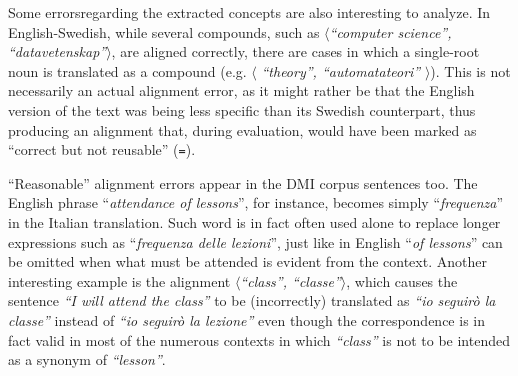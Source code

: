 Some errorsregarding the extracted concepts are also interesting to analyze.
In English-Swedish, while several compounds, such as $\langle$\textit{``computer science'', ``datavetenskap''}$\rangle$, are aligned correctly, there are cases in which a single-root noun is translated as a compound (e.g. $\langle$ \textit{``theory'', ``automatateori''} $\rangle$). This is not necessarily an actual alignment error, as it might rather be that the English version of the text was being less specific than its Swedish counterpart, thus producing an alignment that, during evaluation, would have been marked as ``correct but not reusable'' (\texttt{=}). \smallskip

``Reasonable'' alignment errors appear in the DMI corpus sentences too. 
The English phrase ``\textit{attendance of lessons}'', for instance, becomes simply ``\textit{frequenza}'' in the Italian translation. 
Such word is in fact often used alone to replace longer expressions such as ``\textit{frequenza delle lezioni}'', just like in English ``\textit{of lessons}'' can be omitted when what must be attended is evident from the context.
Another interesting example is the alignment $\langle$\textit{``class'', ``classe''}$\rangle$, which causes the sentence \textit{``I will attend the class''} to be (incorrectly) translated as \textit{``io seguirò la classe''} instead of \textit{``io seguirò la lezione''} even though the correspondence is in fact valid in most of the numerous contexts in which \textit{``class''} is not to be intended as a synonym of \textit{``lesson''}.